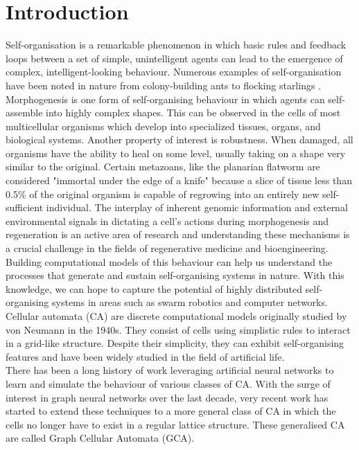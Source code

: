 \chapter{Introduction}

Self-organisation is a remarkable phenomenon in which basic rules and feedback loops between a set of simple, unintelligent agents can lead to the emergence of complex, intelligent-looking behaviour. Numerous examples of self-organisation have been noted in nature from colony-building ants \cite{bonabeau1997self} to flocking starlings \cite{couzin2003self}. 
Morphogenesis is one form of self-organising behaviour in which agents can self-assemble into highly complex shapes. This can be observed in the cells of most multicellular organisms which develop into specialized tissues, organs, and biological systems. Another property of interest is robustness. When damaged, all organisms have the ability to heal on some level, usually taking on a shape very similar to the original. Certain metazoans, like the planarian flatworm are considered "immortal under the edge of a knife" \cite{dalyell1814observations} because a slice of tissue less than 0.5\% of the original organism is capable of regrowing into an entirely new self-sufficient individual. The interplay of inherent genomic information and external environmental signals in dictating a cell's actions during morphogenesis and regeneration is an active area of research \cite{pai2012transmembrane} and understanding these mechanisms is a crucial challenge in the fields of regenerative medicine and bioengineering.\\

Building computational models of this behaviour can help us understand the processes that generate and sustain self-organising systems in nature. With this knowledge, we can hope to capture the potential of highly distributed self-organising systems in areas such as swarm robotics and computer networks. Cellular automata (CA) are discrete computational models originally studied by von Neumann in the 1940s. They consist of cells using simplistic rules to interact in a grid-like structure. Despite their simplicity, they can exhibit self-organising features and have been widely studied in the field of artificial life.\\

There has been a long history of work leveraging artificial neural networks to learn and simulate the behaviour of various classes of CA. With the surge of interest in graph neural networks over the last decade, very recent work has started to extend these techniques to a more general class of CA in which the cells no longer have to exist in a regular lattice structure. These generalised CA are called Graph Cellular Automata (GCA). \\


